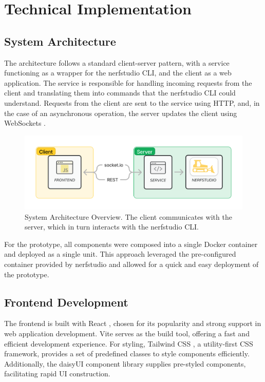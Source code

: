 %
\chapter{Technical Implementation}
\label{sec:system}

\section{System Architecture}
\label{sec:system:architecture}

The architecture follows a standard client-server pattern, with a service functioning as a wrapper for the nerfstudio CLI, and the client as a web application.
The service is responsible for handling incoming requests from the client and translating them into commands that the nerfstudio CLI could understand.
Requests from the client are sent to the service using HTTP, and, in the case of an asynchronous operation, the server updates the client using WebSockets .

\begin{figure}[htb]
	\includegraphics[width=\textwidth]{figures/architecture-1.png}
	\caption{System Architecture Overview. The client communicates with the server, which in turn interacts with the nerfstudio CLI.}
	\label{fig:system:example2}
\end{figure}

For the prototype, all components were composed into a single Docker \cite{noauthor_docker_2022} container and deployed as a single unit.
This approach leveraged the pre-configured container provided by nerfstudio and allowed for a quick and easy deployment of the prototype.

\section{Frontend Development} 
\label{sec:system:frontend}

The frontend is built with React \cite{noauthor_react_nodate}, chosen for its popularity and strong support in web application development.
Vite \cite{noauthor_vite_nodate} serves as the build tool, offering a fast and efficient development experience.
For styling, Tailwind CSS \cite{noauthor_tailwind_2020}, a utility-first CSS framework, provides a set of predefined classes to style components efficiently.
Additionally, the daisyUI \cite{noauthor_daisyui_nodate} component library supplies pre-styled components, facilitating rapid UI construction.

